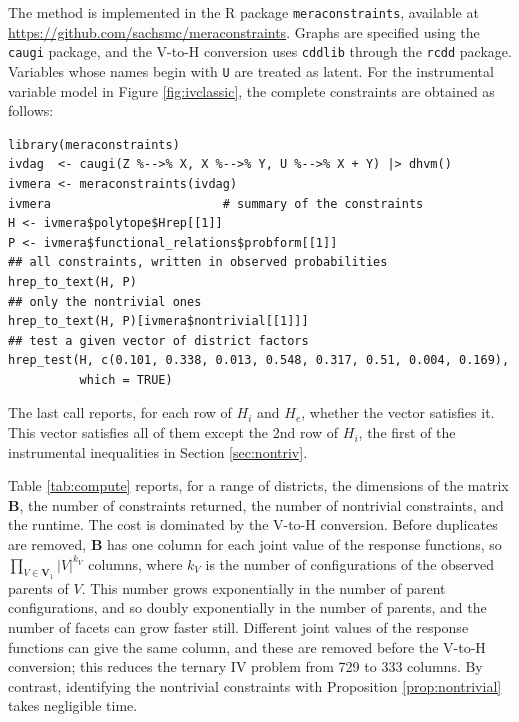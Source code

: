 \documentclass[12pt]{article}
\newcommand{\bV}{\boldsymbol{V}}
\begin{document}
The method is implemented in the R package \texttt{meraconstraints}, available at \url{https://github.com/sachsmc/meraconstraints}. Graphs are specified using the \texttt{caugi} package, and the V-to-H conversion uses \texttt{cddlib} through the \texttt{rcdd} package. Variables whose names begin with \texttt{U} are treated as latent. For the instrumental variable model in Figure \ref{fig:ivclassic}, the complete constraints are obtained as follows:
\begin{verbatim}
library(meraconstraints)
ivdag  <- caugi(Z %-->% X, X %-->% Y, U %-->% X + Y) |> dhvm()
ivmera <- meraconstraints(ivdag)
ivmera                        # summary of the constraints
H <- ivmera$polytope$Hrep[[1]]
P <- ivmera$functional_relations$probform[[1]]
## all constraints, written in observed probabilities
hrep_to_text(H, P)
## only the nontrivial ones
hrep_to_text(H, P)[ivmera$nontrivial[[1]]]
## test a given vector of district factors
hrep_test(H, c(0.101, 0.338, 0.013, 0.548, 0.317, 0.51, 0.004, 0.169),
          which = TRUE)
\end{verbatim}
The last call reports, for each row of $H_i$ and $H_e$, whether the vector satisfies it. This vector satisfies all of them except the 2nd row of $H_i$, the first of the instrumental inequalities in Section \ref{sec:nontriv}.


Table \ref{tab:compute} reports, for a range of districts, the dimensions of the matrix $\boldsymbol{B}$, the number of constraints returned, the number of nontrivial constraints, and the runtime. The cost is dominated by the V-to-H conversion. Before duplicates are removed, $\boldsymbol{B}$ has one column for each joint value of the response functions, so $\prod_{V \in \bV_1} |V|^{k_V}$ columns, where $k_V$ is the number of configurations of the observed parents of $V$. This number grows exponentially in the number of parent configurations, and so doubly exponentially in the number of parents, and the number of facets can grow faster still. Different joint values of the response functions can give the same column, and these are removed before the V-to-H conversion; this reduces the ternary IV problem from 729 to 333 columns. By contrast, identifying the nontrivial constraints with Proposition \ref{prop:nontrivial} takes negligible time.
\end{document}
